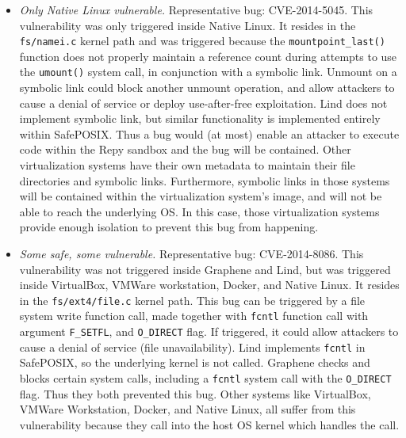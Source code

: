 {\begin{itemize}
\item \emph{Only Native Linux vulnerable.}  Representative bug: CVE-2014-5045.
This vulnerability was only triggered inside Native Linux. It resides in the
\texttt{fs/namei.c} kernel path and was triggered because
the \texttt{mountpoint\_last()}
function does not properly
maintain a reference count during attempts to use the \texttt{umount()} system call,
in conjunction with a symbolic link. Unmount  on a symbolic link could block another unmount operation,
and allow attackers to cause a denial of service or deploy use-after-free exploitation.
Lind does not implement symbolic link, but similar functionality is implemented entirely
within SafePOSIX.  Thus a bug would (at most) enable an attacker to execute
code within the Repy sandbox and the bug will be contained.
Other virtualization systems have their own metadata to maintain their file directories and symbolic links. 
Furthermore, symbolic links in those systems will be contained within the virtualization system's image,
and will not be able to reach the underlying OS. In this case, those virtualization systems provide enough
isolation to prevent this bug from happening.

\item \emph{Some safe, some vulnerable.}  Representative bug: CVE-2014-8086.
This vulnerability was not triggered inside Graphene and Lind, but was triggered inside
VirtualBox, VMWare workstation, Docker, and Native Linux. It resides in the \texttt{fs/ext4/file.c} kernel path.
This bug can be triggered by a file system write function call, made together with \texttt{fcntl} function call
with argument \texttt{F\_SETFL}, and \texttt{O\_DIRECT} flag. If triggered, it could allow attackers to cause
a denial of service (file unavailability). Lind implements \texttt{fcntl}
in SafePOSIX, so the underlying kernel is not called.
Graphene checks and blocks certain system calls, including
a \texttt{fcntl} system call with the \texttt{O\_DIRECT} flag.
Thus they both prevented this bug. Other systems like VirtualBox, VMWare Workstation, Docker, and Native Linux,
all suffer from this vulnerability because they call into the host OS
kernel which handles the call.


\end{itemize}}
